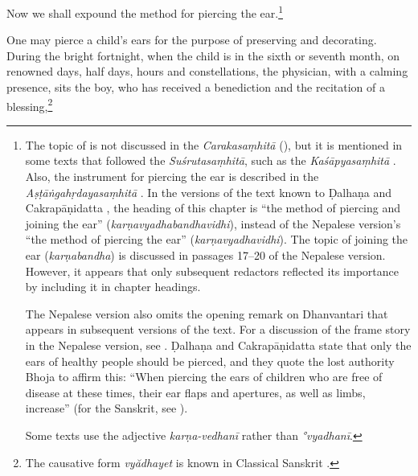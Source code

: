 \begin{translation}    
  
\item [1] 

Now we shall expound the method for piercing the ear.\footnote{The topic of 
     is not discussed in the \emph{Carakasaṃhitā}
    (\cite[IB, 326, n.\,175]{meul-hist}), but it is mentioned in some texts that
    followed the \emph{Suśrutasaṃhitā}, such as the \emph{Kaśāpyasaṃhitā} \citep[IIA,
    30]{meul-hist}. Also, the instrument for piercing the ear is described in the
    \emph{Aṣṭāṅgahṛdayasaṃhitā} . In the versions of the text known
    to Ḍalhaṇa \citep[76]{vulgate} and Cakrapāṇidatta \citep[125]{acar-1939}, the
    heading of this chapter is “the method of piercing and joining the ear”
    (\emph{karṇavyadhabandhavidhi}), instead of the Nepalese version's “the method of
    piercing the ear” (\emph{karṇavyadhavidhi}). The topic of joining the ear
    (\emph{karṇabandha}) is discussed in passages 17--20 of the Nepalese version.
    However, it appears that only subsequent redactors reflected its importance by
    including it in chapter headings.

 The Nepalese version also omits the opening remark on Dhanvantari that appears in
subsequent versions of the text. For a discussion of the frame story in the
Nepalese version, see \cite{birc-2021}. Ḍalhaṇa \citep[76]{vulgate} and
Cakrapāṇidatta \citep[125]{acar-1939} state that only the ears of healthy people
should be pierced, and they quote the lost authority Bhoja to affirm this: “When
piercing the ears of children who are free of disease at these times, their ear
flaps and apertures, as well as limbs, increase” (for the Sanskrit, see
\cite[76]{vulgate}).

Some texts use the adjective \emph{karṇa-vedhanī} rather than \emph{°vyadhanī}.}

\item [2] 

One may pierce a child's ears for the purpose of preserving and decorating. During the
bright fortnight, when the child is in the sixth or seventh month, on renowned
days, half days, hours and constellations, the physician, with a calming presence,
sits the boy, who has received a benediction and the recitation of a
blessing,\footnote{The causative form \emph{vy\u adhayet} is known in Classical
    Sanskrit \citep[166]{whit-root}.

}
\end{translation}
